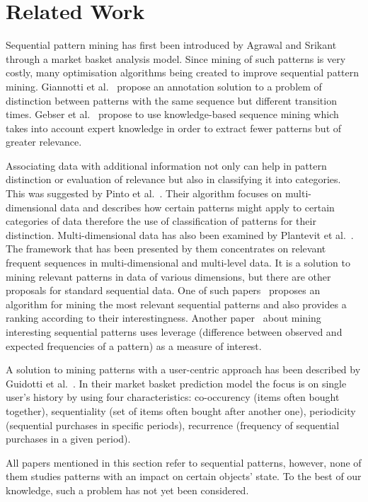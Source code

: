 \documentclass[runningheads,a4paper]{llncs}
\begin{document}
\section{Related Work}
\label{sec:related}
Sequential pattern mining has first been introduced by Agrawal and Srikant~\cite{Agrawal:1995} through a market basket analysis model.
Since mining of such patterns is very costly, many optimisation algorithms being created to improve sequential pattern mining.
Giannotti et al.~\cite{Giannotti:2006} propose an annotation solution to a problem of distinction between patterns with the same sequence but different transition times.
Gebser et al.~\cite{Gebser:2016} propose to use knowledge-based sequence mining which takes into account expert knowledge in order to extract fewer patterns but of greater relevance.

Associating data with additional information not only can help in pattern distinction or evaluation of relevance but also in classifying it into categories.
This was suggested by Pinto et al.~\cite{Pinto:2001}.
Their algorithm focuses on multi-dimensional data and describes how certain patterns might apply to certain categories of data therefore the use of classification of patterns for their distinction.
Multi-dimensional data has also been examined by Plantevit et al.~\cite{Plantevit:2010}.
The framework that has been presented by them concentrates on relevant frequent sequences in multi-dimensional and multi-level data.
It is a solution to mining relevant patterns in data of various dimensions, but there are other proposals for standard sequential data.
One of such papers~\cite{Fowkes:2016} proposes an algorithm for mining the most relevant sequential patterns and also provides a ranking according to their interestingness.
Another paper~\cite{Li:2015} about mining interesting sequential patterns uses leverage (difference between observed and expected frequencies of a pattern) as a measure of interest.

A solution to mining patterns with a user-centric approach has been described by Guidotti et al.~\cite{Guidotti:2017}.
In their market basket prediction model the focus is on single user’s history by using four characteristics: co-occurency (items often bought together), sequentiality (set of items often bought after another one), periodicity (sequential purchases in specific periods), recurrence (frequency of sequential purchases in a given period).

All papers mentioned in this section refer to sequential patterns, however, none of them studies patterns with an impact on certain objects' state.
To the best of our knowledge, such a problem has not yet been considered.
\end{document}
